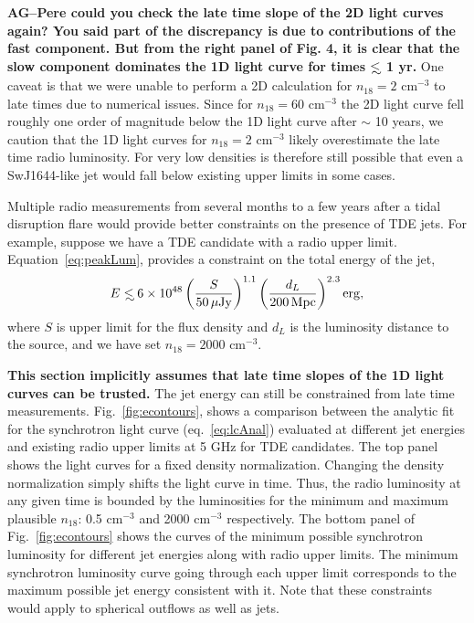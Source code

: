 \documentclass[usenatbib,fleqn]{mnras}
\newcommand\lsim{\mathrel{\rlap{\lower4pt\hbox{\hskip1pt$\sim$}}
    \raise1pt\hbox{$<$}}}
\begin{document}
{\bf AG--Pere could you check the late time slope of the 2D light
  curves again? You said part of the discrepancy is due to
  contributions of the fast component. But from the right panel of
  Fig. 4, it is clear that the slow component dominates the 1D light
  curve for times $\lsim$ 1 yr.}  One caveat is that we were unable to
perform a 2D calculation for $n_{18}=2$ cm$^{-3}$ to late times due to
numerical issues.  Since for $n_{18}=60$ cm$^{-3}$ the 2D light curve
fell roughly one order of magnitude below the 1D light curve after
$\sim$ 10 years, we caution that the 1D light curves for $n_{18}=2$
cm$^{-3}$ likely overestimate the late time radio luminosity.  For
very low densities is therefore still possible that even a
SwJ1644-like jet would fall below existing upper limits in some cases.

Multiple radio measurements from several months to a few years after a
tidal disruption flare would provide better constraints on the
presence of TDE jets. For example, suppose we have a TDE candidate
with a radio upper limit. Equation~\eqref{eq:peakLum}, provides a
constraint on the total energy of the jet,
\begin{equation}
E\lsim 6 \times 10^{48} \left(\frac{S}{50 \,\mu{\rm Jy}}\right)^{1.1}
  \left(\frac{d_L}{200 \,{\rm Mpc}}\right)^{2.3} {\rm erg},
\end{equation}
%
where $S$ is upper limit for the flux density and $d_L$ is the
luminosity distance to the source, and we have set $n_{18}=2000$
cm$^{-3}$.

{\bf This section implicitly assumes that late time slopes of the 1D
  light curves can be trusted.}  The jet energy can still be
constrained from late time measurements. Fig.~\ref{fig:econtours},
shows a comparison between the analytic fit for the synchrotron light
curve (eq.~\ref{eq:lcAnal}) evaluated at different jet energies and
existing radio upper limits at 5 GHz for TDE candidates. The top panel
shows the light curves for a fixed density normalization. Changing the
density normalization simply shifts the light curve in time. Thus, the
radio luminosity at any given time is bounded by the luminosities for
the minimum and maximum plausible $n_{18}$: 0.5 cm$^{-3}$ and 2000
cm$^{-3}$ respectively. The bottom panel of Fig.~\ref{fig:econtours}
shows the curves of the minimum possible synchrotron luminosity for
different jet energies along with radio upper limits. The minimum
synchrotron luminosity curve going through each upper limit
corresponds to the maximum possible jet energy consistent with
it. Note that these constraints would apply to spherical outflows as
well as jets.
\end{document}
